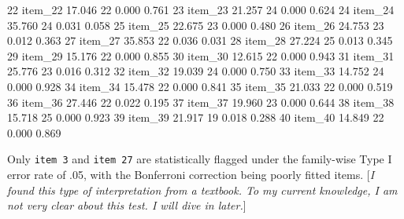 \documentclass[
]{article}
\newenvironment{Shaded}{\begin{snugshade}}{\end{snugshade}}
\newcommand{\DecValTok}[1]{\textcolor[rgb]{0.00,0.00,0.81}{#1}}
\newcommand{\FloatTok}[1]{\textcolor[rgb]{0.00,0.00,0.81}{#1}}
\newcommand{\NormalTok}[1]{#1}
\begin{document}
\begin{Shaded}
\begin{Highlighting}[]
\DecValTok{22}\NormalTok{ item\_22 }\FloatTok{17.046}      \DecValTok{22}      \FloatTok{0.000}  \FloatTok{0.761}
\DecValTok{23}\NormalTok{ item\_23 }\FloatTok{21.257}      \DecValTok{24}      \FloatTok{0.000}  \FloatTok{0.624}
\DecValTok{24}\NormalTok{ item\_24 }\FloatTok{35.760}      \DecValTok{24}      \FloatTok{0.031}  \FloatTok{0.058}
\DecValTok{25}\NormalTok{ item\_25 }\FloatTok{22.675}      \DecValTok{23}      \FloatTok{0.000}  \FloatTok{0.480}
\DecValTok{26}\NormalTok{ item\_26 }\FloatTok{24.753}      \DecValTok{23}      \FloatTok{0.012}  \FloatTok{0.363}
\DecValTok{27}\NormalTok{ item\_27 }\FloatTok{35.853}      \DecValTok{22}      \FloatTok{0.036}  \FloatTok{0.031}
\DecValTok{28}\NormalTok{ item\_28 }\FloatTok{27.224}      \DecValTok{25}      \FloatTok{0.013}  \FloatTok{0.345}
\DecValTok{29}\NormalTok{ item\_29 }\FloatTok{15.176}      \DecValTok{22}      \FloatTok{0.000}  \FloatTok{0.855}
\DecValTok{30}\NormalTok{ item\_30 }\FloatTok{12.615}      \DecValTok{22}      \FloatTok{0.000}  \FloatTok{0.943}
\DecValTok{31}\NormalTok{ item\_31 }\FloatTok{25.776}      \DecValTok{23}      \FloatTok{0.016}  \FloatTok{0.312}
\DecValTok{32}\NormalTok{ item\_32 }\FloatTok{19.039}      \DecValTok{24}      \FloatTok{0.000}  \FloatTok{0.750}
\DecValTok{33}\NormalTok{ item\_33 }\FloatTok{14.752}      \DecValTok{24}      \FloatTok{0.000}  \FloatTok{0.928}
\DecValTok{34}\NormalTok{ item\_34 }\FloatTok{15.478}      \DecValTok{22}      \FloatTok{0.000}  \FloatTok{0.841}
\DecValTok{35}\NormalTok{ item\_35 }\FloatTok{21.033}      \DecValTok{22}      \FloatTok{0.000}  \FloatTok{0.519}
\DecValTok{36}\NormalTok{ item\_36 }\FloatTok{27.446}      \DecValTok{22}      \FloatTok{0.022}  \FloatTok{0.195}
\DecValTok{37}\NormalTok{ item\_37 }\FloatTok{19.960}      \DecValTok{23}      \FloatTok{0.000}  \FloatTok{0.644}
\DecValTok{38}\NormalTok{ item\_38 }\FloatTok{15.718}      \DecValTok{25}      \FloatTok{0.000}  \FloatTok{0.923}
\DecValTok{39}\NormalTok{ item\_39 }\FloatTok{21.917}      \DecValTok{19}      \FloatTok{0.018}  \FloatTok{0.288}
\DecValTok{40}\NormalTok{ item\_40 }\FloatTok{14.849}      \DecValTok{22}      \FloatTok{0.000}  \FloatTok{0.869}
\end{Highlighting}
\end{Shaded}

Only \texttt{item\ 3} and \texttt{item\ 27} are statistically flagged
under the family-wise Type I error rate of .05, with the Bonferroni
correction being poorly fitted items. {[}\emph{I found this type of
interpretation from a textbook. To my current knowledge, I am not very
clear about this test. I will dive in later.}{]}
\end{document}
